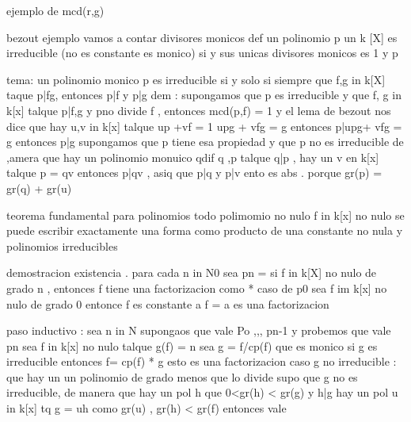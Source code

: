 ejemplo de mcd(r,g)

bezout ejemplo
vamos a contar divisores monicos 
def un polinomio p un k [X]
es irreducible (no es constante es monico) si y sus unicas divisores monicos es 1 y p 

tema: un polinomio monico p es irreducible si y solo si siempre que f,g in k[X]
taque p|fg, entonces p|f y p|g
dem : supongamos que p es irreducible y que f, g in k[x] talque p|f,g y pno divide f , entonces mcd(p,f) = 1 
y el lema de bezout nos dice que hay u,v in k[x] talque up +vf = 1
 upg + vfg = g 
 entonces p|upg+ vfg = g 
 entonces p|g 
 supongamos que p tiene esa propiedad y que p no es irreducible de ,amera que hay un polinomio monuico qdif q ,p talque q|p , hay un v en k[x]
 talque p = qv entonces p|qv , asiq que p|q y p|v ento es abs . porque gr(p) = gr(q) + gr(u)



 teorema fundamental para polinomios 
 todo polimomio no nulo f in k[x] no nulo se puede escribir exactamente una forma como producto de una constante no nula y polinomios irreducibles

 demostracion existencia . para cada n in N0 sea pn = si f in k[X] no nulo de grado n , entonces f tiene una factorizacion como * 
 caso de p0 sea f im k[x] no nulo de grado 0 entonce f es constante a f = a es una factorizacion

 paso inductivo : sea n in N supongaos que vale Po ,,, pn-1 y probemos que vale pn sea f in k[x] no nulo 
 talque g(f) = n sea g = f/cp(f) que es monico si g es irreducible entonces f= cp(f) * g esto es una factorizacion
 caso g no irreducible : que hay un un polinomio de grado menos que lo divide 
 supo que g no es irreducible, de manera que hay un pol h que 0<gr(h) < gr(g) y h|g
 hay un pol u in k[x] tq  g = uh
 como gr(u) , gr(h) < gr(f)
 entonces vale 
